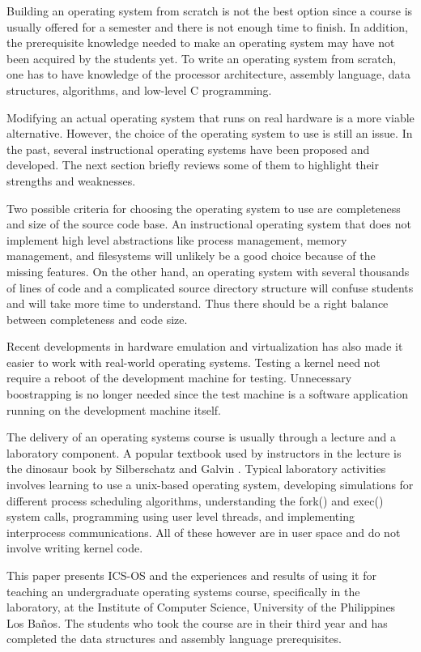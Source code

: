 \documentclass{acm_proc_article-sp}
\begin{document}
Building an operating system from scratch is not the best option since a course
is usually offered for a semester and there is not enough time to finish. In 
addition, the prerequisite knowledge needed to make an operating system may have
not been acquired by the students yet. To write an operating system from 
scratch, one has to have knowledge of the processor architecture, assembly
language, data structures, algorithms, and low-level C programming.

Modifying an actual operating system that runs on real hardware is a more
viable alternative. However, the choice of the operating system to use is
still an issue. In the past, several instructional operating systems have been
proposed and developed. The next section briefly reviews some of them 
to highlight their strengths and weaknesses.

Two possible criteria for choosing the operating system to use are completeness 
and size of the source code base. An instructional operating system that does
not implement high level abstractions like process management, memory 
management, and filesystems will unlikely be a good choice because
of the missing features. On the other hand, an operating system with several 
thousands of lines of code and a complicated source directory structure will
confuse students and will take more time to understand. Thus there should
be a right balance between completeness and code size.

Recent developments in hardware emulation and virtualization has also made it 
easier to work with real-world operating systems. Testing a kernel need not
require a reboot of the development machine for testing. Unnecessary 
boostrapping is no longer needed since the test machine is a software
application running on the development machine itself.
 
The delivery of an operating systems course is usually through a lecture and 
a laboratory component. A popular textbook used by instructors in the 
lecture is the dinosaur book by Silberschatz and Galvin \cite{silberschatz:osc}.
Typical laboratory activities involves learning to use a unix-based operating
system, developing simulations for different process scheduling algorithms, 
understanding the fork() and exec() system calls, programming using user
level threads, and implementing interprocess communications. All of these
however are in user space and do not involve writing kernel code.

This paper presents ICS-OS and the experiences and results of using it for 
teaching an undergraduate operating systems course, specifically in the
laboratory, at the Institute of Computer Science, University of the Philippines
Los Ba\~nos. The students who took the course are in their third year and
has completed the data structures and assembly language prerequisites.
\end{document}
